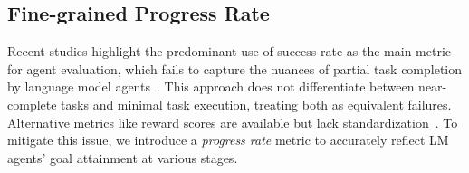 



\subsection{Fine-grained Progress Rate \label{sec:fine-grained progress rate}}

Recent studies highlight the predominant use of success rate as the main metric for agent evaluation, which fails to capture the nuances of partial task completion by language model agents~\citep{liu2023agentbench, li2023api}. This approach does not differentiate between near-complete tasks and minimal task execution, treating both as equivalent failures. Alternative metrics like reward scores are available but lack standardization~\citep{chevalier2018babyai, wang2022scienceworld}. To mitigate this issue, we introduce a \emph{progress rate} metric to accurately reflect LM agents' goal attainment at various stages.

